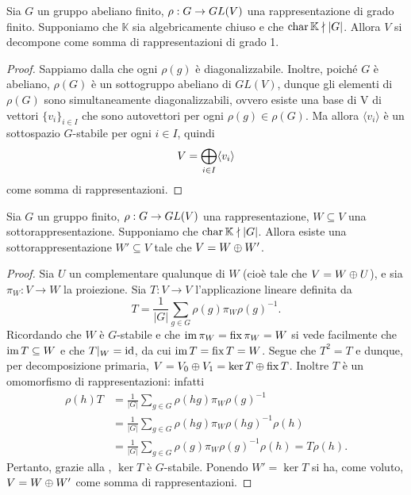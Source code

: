 \begin{proposition}
Sia $G$ un gruppo abeliano finito, $\rho:G\to GL(V)$ una rappresentazione di grado finito. Supponiamo che $\mathbb{K}$ sia algebricamente chiuso e che $\operatorname{char}\mathbb{K}\nmid |G|$. Allora $V$ si decompone come somma di rappresentazioni di grado 1.
\end{proposition}
\begin{proof}
Sappiamo dalla  che ogni $\rho(g)$ è diagonalizzabile. Inoltre, poiché $G$ è abeliano, $\rho(G)$ è un sottogruppo abeliano di $GL(V)$, dunque gli elementi di $\rho(G)$ sono simultaneamente diagonalizzabili, ovvero esiste una base di V  di vettori $\{v_i\}_{i\in I}$ che sono autovettori per ogni $\rho(g)\in\rho(G)$. Ma allora $\langle v_i\rangle$ è un sottospazio $G$-stabile per ogni $i\in I$, quindi
$$
V=\bigoplus_{i\in I}\langle v_i\rangle
$$
come somma di rappresentazioni.
\end{proof}

\begin{proposition}
Sia $G$ un gruppo finito, $\rho:G\to GL(V)$ una rappresentazione, $W\subseteq V$ una sottorappresentazione. Supponiamo che $\operatorname{char}\mathbb{K}\nmid|G|$. Allora esiste una sottorappresentazione $W'\subseteq V$ tale che $V=W\oplus W'$.
\end{proposition}
\begin{proof}
Sia $U$ un complementare qualunque di $W$ (cioè tale che $V=W\oplus U$), e sia $\pi_W:V\to W$ la proiezione. Sia $T:V\to V$ l'applicazione lineare definita da
$$
T=\frac{1}{|G|}\sum_{g\in G}\rho(g)\pi_W\rho(g)^{-1}.
$$
Ricordando che $W$ è $G$-stabile e che $\operatorname{im}\pi_W=\operatorname{fix}\pi_W=W$ si vede facilmente che $\operatorname{im} T\subseteq W$ e che $T|_W=\operatorname{id}$, da cui $\operatorname{im} T=\operatorname{fix} T=W$. Segue che $T^2=T$ e dunque, per decomposizione primaria, $V=V_0\oplus V_1=\ker T\oplus\operatorname{fix} T$. Inoltre $T$ è un omomorfismo di rappresentazioni: infatti
\begin{align*}
\rho(h)T&=\frac{1}{|G|}\sum_{g\in G}\rho(hg)\pi_W\rho(g)^{-1}\\
&=\frac{1}{|G|}\sum_{g\in G}\rho(hg)\pi_W\rho(hg)^{-1}\rho(h)\\
&=\frac{1}{|G|}\sum_{g\in G}\rho(g)\pi_W\rho(g)^{-1}\rho(h)=T\rho(h).
\end{align*}
Pertanto, grazie alla , $\ker T$ è $G$-stabile. Ponendo $W'=\ker T$ si ha, come voluto, $V=W\oplus W'$  come somma di rappresentazioni.
\end{proof}

